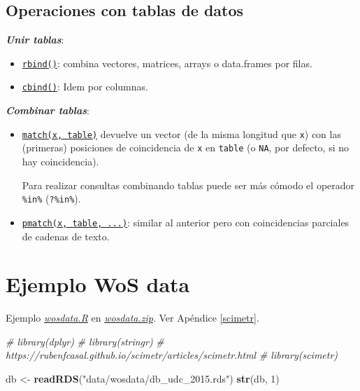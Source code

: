 \documentclass[
]{book}
\newenvironment{Shaded}{\begin{snugshade}}{\end{snugshade}}
\newcommand{\CommentTok}[1]{\textcolor[rgb]{0.56,0.35,0.01}{\textit{#1}}}
\newcommand{\DecValTok}[1]{\textcolor[rgb]{0.00,0.00,0.81}{#1}}
\newcommand{\KeywordTok}[1]{\textcolor[rgb]{0.13,0.29,0.53}{\textbf{#1}}}
\newcommand{\NormalTok}[1]{#1}
\newcommand{\StringTok}[1]{\textcolor[rgb]{0.31,0.60,0.02}{#1}}
\begin{document}
\hypertarget{operaciones-con-tablas-de-datos}{%
\subsection{Operaciones con tablas de datos}\label{operaciones-con-tablas-de-datos}}

\textbf{\emph{Unir tablas}}:

\begin{itemize}
\item
  \href{https://www.rdocumentation.org/packages/base/versions/3.6.1/topics/rbind}{\texttt{rbind()}}: combina vectores, matrices, arrays o data.frames por filas.
\item
  \href{https://www.rdocumentation.org/packages/base/versions/3.6.1/topics/cbind}{\texttt{cbind()}}: Idem por columnas.
\end{itemize}

\textbf{\emph{Combinar tablas}}:

\begin{itemize}
\item
  \href{https://www.rdocumentation.org/packages/base/versions/3.6.1/topics/match}{\texttt{match(x,\ table)}} devuelve un vector (de la misma longitud que \texttt{x}) con las (primeras) posiciones de coincidencia de \texttt{x} en \texttt{table} (o \texttt{NA}, por defecto, si no hay coincidencia).

  Para realizar consultas combinando tablas puede ser más cómodo el operador \texttt{\%in\%} (\texttt{?\textquotesingle{}\%in\%\textquotesingle{}}).
\item
  \href{https://www.rdocumentation.org/packages/base/versions/3.6.1/topics/pmatch}{\texttt{pmatch(x,\ table,\ ...)}}: similar al anterior pero con coincidencias parciales de cadenas de texto.
\end{itemize}

\hypertarget{ejemplo-wos-data}{%
\section{Ejemplo WoS data}\label{ejemplo-wos-data}}

Ejemplo \href{data/wosdata.R}{\emph{wosdata.R}} en \href{data/wosdata.zip}{\emph{wosdata.zip}}.
Ver Apéndice \ref{scimetr}.

\begin{Shaded}
\begin{Highlighting}[]
\CommentTok{# library(dplyr)}
\CommentTok{# library(stringr)}
\CommentTok{# https://rubenfcasal.github.io/scimetr/articles/scimetr.html}
\CommentTok{# library(scimetr)}

\NormalTok{db <-}\StringTok{ }\KeywordTok{readRDS}\NormalTok{(}\StringTok{"data/wosdata/db_udc_2015.rds"}\NormalTok{)}
\KeywordTok{str}\NormalTok{(db, }\DecValTok{1}\NormalTok{)}
\end{Highlighting}
\end{Shaded}
\end{document}

